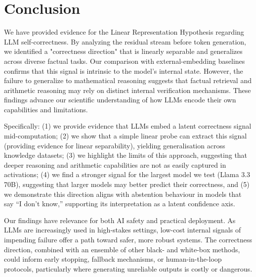 \documentclass{article} %
\begin{document}
\section{Conclusion}

We have provided evidence for the Linear Representation Hypothesis regarding LLM self-correctness. By analyzing the residual stream before token generation, we identified a "correctness direction" that is linearly separable and generalizes across diverse factual tasks. Our comparison with external-embedding baselines confirms that this signal is intrinsic to the model's internal state. However, the failure to generalize to mathematical reasoning suggests that factual retrieval and arithmetic reasoning may rely on distinct internal verification mechanisms. These findings advance our scientific understanding of how LLMs encode their own capabilities and limitations.

Specifically: (1) we provide evidence that LLMs embed a latent correctness signal mid-computation; (2) we show that a simple linear probe can extract this signal (providing evidence for linear separability), yielding generalisation across knowledge datasets; (3) we highlight the limits of this approach, suggesting that deeper reasoning and arithmetic capabilities are not as easily captured in activations; (4) we find a stronger signal for the largest model we test (Llama 3.3 70B), suggesting that larger models may better predict their correctness, and (5) we demonstrate this direction aligns with abstention behaviour in models that say “I don’t know,” supporting its interpretation as a latent confidence axis. %


Our findings have relevance for both AI safety and practical deployment. As LLMs are increasingly used in high-stakes settings, low-cost internal signals of impending failure offer a path toward safer, more robust systems. The correctness direction, combined with an ensemble of other black- and white-box methods, could inform early stopping, fallback mechanisms, or human-in-the-loop protocols, particularly where generating unreliable outputs is costly or dangerous.
\end{document}
